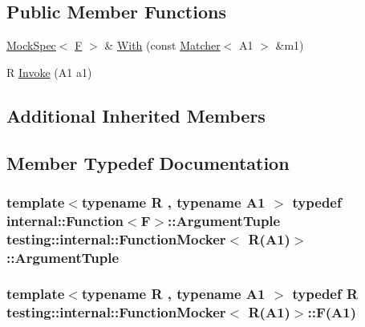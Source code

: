 \subsection*{Public Member Functions}
\begin{DoxyCompactItemize}
\item 
\hyperlink{classtesting_1_1internal_1_1MockSpec}{Mock\+Spec}$<$ \hyperlink{classtesting_1_1internal_1_1FunctionMocker_3_01R_07A1_08_4_ada54286442ab14a18c2308cef748848f}{F} $>$ \& \hyperlink{classtesting_1_1internal_1_1FunctionMocker_3_01R_07A1_08_4_aa61b5c24c52b8c49713774c49a01b26e}{With} (const \hyperlink{classtesting_1_1Matcher}{Matcher}$<$ A1 $>$ \&m1)
\item 
R \hyperlink{classtesting_1_1internal_1_1FunctionMocker_3_01R_07A1_08_4_a4a58d37902572c8136d999c5008dce1a}{Invoke} (A1 a1)
\end{DoxyCompactItemize}
\subsection*{Additional Inherited Members}


\subsection{Member Typedef Documentation}
\subsubsection[{\texorpdfstring{Argument\+Tuple}{ArgumentTuple}}]{\setlength{\rightskip}{0pt plus 5cm}template$<$typename R , typename A1 $>$ typedef {\bf internal\+::\+Function}$<${\bf F}$>$\+::{\bf Argument\+Tuple} {\bf testing\+::internal\+::\+Function\+Mocker}$<$ R(A1)$>$\+::{\bf Argument\+Tuple}}\hypertarget{classtesting_1_1internal_1_1FunctionMocker_3_01R_07A1_08_4_aacec6412ac4343c071d7dfe965558b0b}{}\label{classtesting_1_1internal_1_1FunctionMocker_3_01R_07A1_08_4_aacec6412ac4343c071d7dfe965558b0b}
\subsubsection[{\texorpdfstring{F}{F}}]{\setlength{\rightskip}{0pt plus 5cm}template$<$typename R , typename A1 $>$ typedef R {\bf testing\+::internal\+::\+Function\+Mocker}$<$ R(A1)$>$\+::F(A1)}\hypertarget{classtesting_1_1internal_1_1FunctionMocker_3_01R_07A1_08_4_ada54286442ab14a18c2308cef748848f}{}\label{classtesting_1_1internal_1_1FunctionMocker_3_01R_07A1_08_4_ada54286442ab14a18c2308cef748848f}


